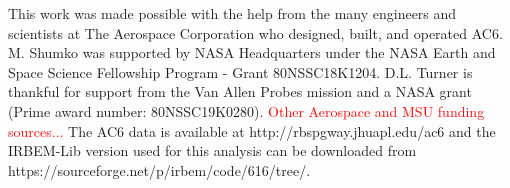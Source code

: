 \documentclass[draft]{agujournal2019}
\begin{document}
%
%
%
%
%
%
%
%


\acknowledgments
This work was made possible with the help from the many engineers and scientists at The Aerospace Corporation who designed, built, and operated AC6. M. Shumko was supported by NASA Headquarters under the NASA Earth and Space Science Fellowship Program - Grant 80NSSC18K1204. D.L. Turner is thankful for support from the Van Allen Probes mission and a NASA grant (Prime award number: 80NSSC19K0280). \textcolor{red}{Other Aerospace and MSU funding sources...} The AC6 data is available at http://rbspgway.jhuapl.edu/ac6 and the IRBEM-Lib version used for this analysis can be downloaded from https://sourceforge.net/p/irbem/code/616/tree/.


%
%



%
%
%
%
%
\end{document}
